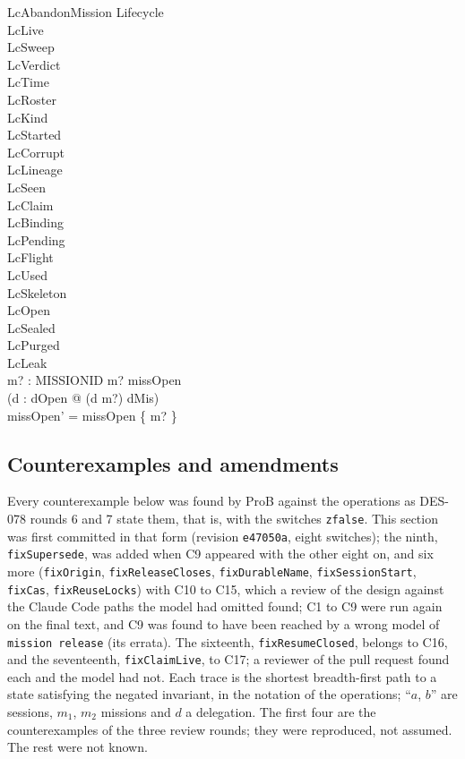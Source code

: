 \documentclass[a4paper,10pt,fleqn]{article}
\newcommand{\field}[1]{\texttt{#1}}
\begin{document}
\begin{schema}{LcAbandonMission}
\Delta Lifecycle \\
\Xi LcLive \\
\Xi LcSweep \\
\Xi LcVerdict \\
\Xi LcTime \\
\Xi LcRoster \\
\Xi LcKind \\
\Xi LcStarted \\
\Xi LcCorrupt \\
\Xi LcLineage \\
\Xi LcSeen \\
\Xi LcClaim \\
\Xi LcBinding \\
\Xi LcPending \\
\Xi LcFlight \\
\Xi LcUsed \\
\Xi LcSkeleton \\
\Xi LcOpen \\
\Xi LcSealed \\
\Xi LcPurged \\
\Xi LcLeak \\
m? : MISSIONID
\where
m? \in missOpen \\
\lnot (\exists d : dOpen @ (d \mapsto m?) \in dMis) \\
missOpen' = missOpen \setminus \{ m? \}
\end{schema}



\subsection{Counterexamples and amendments}
\label{sec:lc-ledger}

Every counterexample below was found by ProB against the operations as
DES-078 rounds 6 and 7 state them, that is, with the switches \field{zfalse}.
This section was first committed in that form (revision \texttt{e47050a},
eight switches); the ninth, \field{fixSupersede}, was added when C9 appeared
with the other eight on, and six more (\field{fixOrigin},
\field{fixReleaseCloses}, \field{fixDurableName}, \field{fixSessionStart},
\field{fixCas}, \field{fixReuseLocks}) with C10 to C15, which a review of the
design against the Claude Code paths the model had omitted found; C1 to C9
were run again on the final text, and C9 was found to have been reached by a
wrong model of \field{mission release} (its errata). The sixteenth,
\field{fixResumeClosed}, belongs to C16, and the seventeenth,
\field{fixClaimLive}, to C17; a reviewer of the pull request found each and
the model had not. Each
trace is the shortest breadth-first path to a state satisfying the negated
invariant, in the notation of the operations; ``$a$, $b$'' are sessions,
$m_1$, $m_2$ missions and $d$ a delegation. The first four are the
counterexamples of the three review rounds; they were reproduced, not
assumed. The rest were not known.
\end{document}
